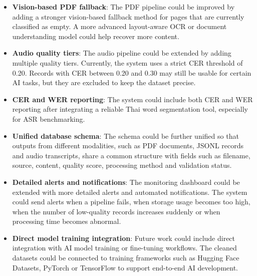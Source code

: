 \documentclass[12pt,oneside,openright,a4paper]{cpe-english-project}
\begin{document}
\begin{itemize}
\item \textbf{Vision-based PDF fallback}: The PDF pipeline could be improved by adding a stronger vision-based fallback method for pages that are currently classified as empty. A more advanced layout-aware OCR or document understanding model could help recover more content.
\item \textbf{Audio quality tiers}: The audio pipeline could be extended by adding multiple quality tiers. Currently, the system uses a strict CER threshold of 0.20. Records with CER between 0.20 and 0.30 may still be usable for certain AI tasks, but they are excluded to keep the dataset precise.
\item \textbf{CER and WER reporting}: The system could include both CER and WER reporting after integrating a reliable Thai word segmentation tool, especially for ASR benchmarking.
\item \textbf{Unified database schema}: The schema could be further unified so that outputs from different modalities, such as PDF documents, JSONL records and audio transcripts, share a common structure with fields such as filename, source, content, quality score, processing method and validation status.
\item \textbf{Detailed alerts and notifications}: The monitoring dashboard could be extended with more detailed alerts and automated notifications. The system could send alerts when a pipeline fails, when storage usage becomes too high, when the number of low-quality records increases suddenly or when processing time becomes abnormal.
\item \textbf{Direct model training integration}: Future work could include direct integration with AI model training or fine-tuning workflows. The cleaned datasets could be connected to training frameworks such as Hugging Face Datasets, PyTorch or TensorFlow to support end-to-end AI development.
\end{itemize}

\makeatletter
\g@addto@macro{\UrlBreaks}{\UrlOrds}
\makeatother
\end{document}
